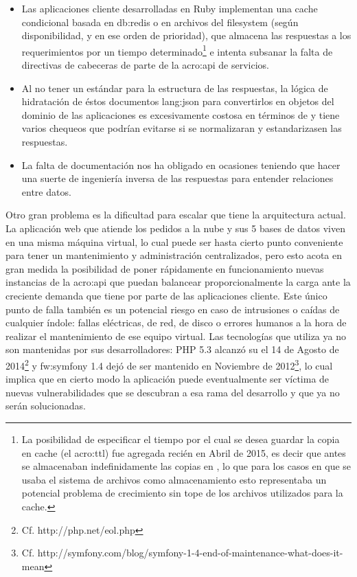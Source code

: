 \begin{itemize}
  \item Las aplicaciones cliente desarrolladas en Ruby implementan una cache condicional basada en \gls{db:redis} o en archivos del filesystem (según disponibilidad, y en ese orden de prioridad), que almacena las respuestas a los requerimientos por un tiempo determinado\footnote{La posibilidad de especificar el tiempo por el cual se desea guardar la copia en cache (el \gls{acro:ttl}) fue agregada recién en Abril de 2015, es decir que antes se almacenaban indefinidamente las copias en , lo que para los casos en que se usaba el sistema de archivos como almacenamiento esto representaba un potencial problema de crecimiento sin tope de los archivos utilizados para la cache.} e intenta subsanar la falta de directivas de cabeceras de parte de la \gls{acro:api} de servicios.

  \item Al no tener un estándar para la estructura de las respuestas, la lógica de hidratación de éstos documentos \gls{lang:json} para convertirlos en objetos del dominio de las aplicaciones es excesivamente costosa en términos de  y tiene varios chequeos que podrían evitarse si se normalizaran y estandarizasen las respuestas.

  \item La falta de documentación nos ha obligado en ocasiones teniendo que hacer una suerte de ingeniería inversa de las respuestas para entender relaciones entre datos.
\end{itemize}

Otro gran problema es la dificultad para escalar que tiene la arquitectura actual. La aplicación web que atiende los pedidos a la nube y sus 5 bases de datos viven en una misma máquina virtual, lo cual puede ser hasta cierto punto conveniente para tener un mantenimiento y administración centralizados, pero esto acota en gran medida la posibilidad de poner rápidamente en funcionamiento nuevas instancias de la \gls{acro:api} que puedan balancear proporcionalmente la carga ante la creciente demanda que tiene por parte de las aplicaciones cliente. Este único punto de falla también es un potencial riesgo en caso de intrusiones o caídas de cualquier índole: fallas eléctricas, de red, de disco o errores humanos a la hora de realizar el mantenimiento de ese equipo virtual. Las tecnologías que utiliza ya no son mantenidas por sus desarrolladores: PHP 5.3 alcanzó su  el 14 de Agosto de 2014\footnote{Cf. http://php.net/eol.php} y \gls{fw:symfony} 1.4 dejó de ser mantenido en Noviembre de 2012\footnote{Cf. http://symfony.com/blog/symfony-1-4-end-of-maintenance-what-does-it-mean}, lo cual implica que en cierto modo la aplicación puede eventualmente ser víctima de nuevas vulnerabilidades que se descubran a esa rama del desarrollo y que ya no serán solucionadas.

